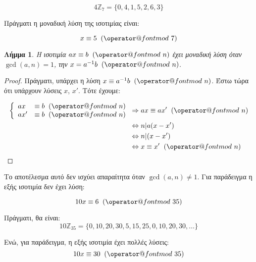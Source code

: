 \documentclass[11pt,a4paper]{book}
\makeatletter
\newtheorem*{lemma}{Λήμμα}
\def\imod#1{\allowbreak\mkern10mu({\operator@font mod}\,\,#1)}
\makeatother
\begin{document}
\[
4 \mathbb{Z}_7 = \{ 0, 4, 1, 5, 2, 6, 3 \}
\]

Πράγματι η μοναδική λύση της ισοτιμίας είναι:

\[
x \equiv 5 \imod 7
\]

\begin{lemma}
Η ισοτιμία $ax \equiv b \imod n$ έχει μοναδική λύση όταν $\gcd( a, n ) = 1$, την $x = a^{-1}b\imod n$.
\end{lemma}
\begin{proof}
Πράγματι, υπάρχει η λύση $x \equiv a^{-1}b \imod n$. Έστω τώρα ότι υπάρχουν λύσεις $x$, $x'$. Τότε έχουμε:

\begin{align*}
	\left\{ \begin{array}{ll}
         ax &\equiv b \imod n\\
         ax' &\equiv b \imod n\end{array} \right.
    &\Rightarrow ax \equiv ax' \imod n\\
    &\Leftrightarrow n|a(x - x')\\
    &\Leftrightarrow n|(x - x')\\
    &\Leftrightarrow x \equiv x' \imod n
\end{align*}
\end{proof}

Το αποτέλεσμα αυτό δεν ισχύει απαραίτητα όταν $\gcd( a, n ) \neq 1$. Για παράδειγμα η εξής ισοτιμία δεν έχει λύση:

\[
10x \equiv 6 \imod{35}
\]

Πράγματι, θα είναι:
\[
10\mathbb{Z}_{35} = \{ 0, 10, 20, 30, 5, 15, 25, 0, 10, 20, 30, \dots \}
\]

Ενώ, για παράδειγμα, η εξής ισοτιμία έχει πολλές λύσεις:
\[
10x \equiv 30 \imod{35}
\]
\end{document}
